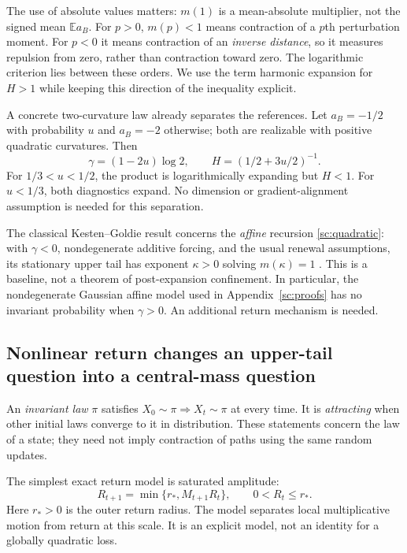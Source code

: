 The use of absolute values matters: $m(1)$ is a mean-absolute multiplier, not the signed mean $\mathbb E a_B$. For $p>0$, $m(p)<1$ means contraction of a $p$th perturbation moment. For $p<0$ it means contraction of an \emph{inverse distance}, so it measures repulsion from zero, rather than contraction toward zero. The logarithmic criterion lies between these orders. We use the term harmonic expansion for $H>1$ while keeping this direction of the inequality explicit.

A concrete two-curvature law already separates the references. Let $a_B=-1/2$ with probability $u$ and $a_B=-2$ otherwise; both are realizable with positive quadratic curvatures. Then
\begin{equation}
 \gamma=(1-2u)\log2,\qquad H=(1/2+3u/2)^{-1}.
 \label{eq:two-curvatures}
\end{equation}
For $1/3<u<1/2$, the product is logarithmically expanding but $H<1$. For $u<1/3$, both diagnostics expand. No dimension or gradient-alignment assumption is needed for this separation.

The classical Kesten--Goldie result concerns the \emph{affine} recursion
\eqref{sc:quadratic}: with \(\gamma<0\), nondegenerate additive forcing, and
the usual renewal assumptions, its stationary upper tail has exponent
\(\kappa>0\) solving \(m(\kappa)=1\)
\citep{kesten1973random,goldie1991implicit}.
This is a baseline, not a theorem of post-expansion confinement. In
particular, the nondegenerate Gaussian affine model used in
Appendix~\ref{sc:proofs} has no invariant probability when \(\gamma>0\).
An additional return mechanism is needed.

\subsection{Nonlinear return changes an upper-tail question into a central-mass question}
An \emph{invariant law} $\pi$ satisfies $X_0\sim\pi\Rightarrow X_t\sim\pi$ at every time. It is \emph{attracting} when other initial laws converge to it in distribution. These statements concern the law of a state; they need not imply contraction of paths using the same random updates.

The simplest exact return model is saturated amplitude:
\begin{equation}
 R_{t+1}=\min\{r_*,M_{t+1}R_t\},\qquad 0<R_t\le r_*.
 \label{sc:saturation}
\end{equation}
Here $r_*>0$ is the outer return radius. The model separates local multiplicative motion from return at this scale.
It is an explicit model, not an identity for a globally quadratic loss.

